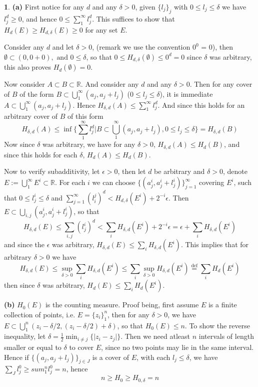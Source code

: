 \documentclass[10.5pt]{article}
\theoremstyle{definition}
\newtheorem{pb}{}
\newcommand{\set}[1]{\{#1\}}
\newcommand{\abs}[1]{\lvert#1\rvert}
\newcommand{\tand}{\text{ and }}
\begin{document}
    \begin{pb}
        \textbf{(a)} First notice for any \(d\) and any \(\delta > 0\), given \(\set{l_j}_j\) with \(0 \leq l_j \leq \delta\) we have \(l_j^d \geq 0\), and hence
        \(0 \leq \sum_1^\infty l_j^d\). This suffices to show that \(H_d(E) \geq H_{d,\delta}(E) \geq 0\) for any set \(E\).

        Consider any \(d\) and let \(\delta > 0\), (remark we use the convention \(0^0\) = 0), then \(\emptyset \subset (0,0+0), \tand 0 \leq \delta\), so that \(0 \leq H_{d,\delta}(\emptyset) \leq 0^d = 0\)
        since \(\delta\) was arbitrary, this also proves \(H_{d}(\emptyset) = 0\).

        Now consider \(A \subset B \subset \mathbb{R}\). And consider any \(d\) and any \(\delta > 0\). Then for any cover of \(B\) of the form \(B \subset \bigcup_1^\infty (a_j,a_j + l_j)\) (\(0 \leq l_j \leq \delta\)),
        it is immediate \(A \subset \bigcup_1^\infty (a_j,a_j + l_j)\). Hence \(H_{\delta,d}(A) \leq \sum_1^\infty l_j^d\). And since this holds for an arbitrary cover of \(B\) of this form
        \[H_{\delta,d}(A) \leq \inf\set{\sum_1^\infty l_j^d \vert B \subset \bigcup_1^\infty (a_j,a_j + l_j), 0 \leq l_j \leq \delta} = H_{\delta,d}(B)\]
        Now since \(\delta\) was arbitrary, we have for any \(\delta > 0\), \(H_{\delta,d}(A) \leq H_d(B)\), and since this holds for each \(\delta\), \(H_{d}(A) \leq H_d(B)\).

        Now to verify subadditivity, let \(\epsilon > 0\), then let \(d\) be arbitrary and \(\delta > 0\),
        denote \(E := \bigcup_1^\infty E^i \subset \mathbb{R}\). For each \(i\) we can choose \(\set{(a_j^i,a_j^i + l_j^i)}_{j=1}^\infty\) covering \(E^i\), such that \(0 \leq l_j^i \leq \delta\)
        and \(\sum_{j=1}^\infty (l_i^j)^d < H_{d,\delta}(E^i) + 2^{-i}\epsilon\). Then \(E \subset \bigcup_{i,j}(a_j^i, a_j^i + l_j^i)\), so that
        \[H_{\delta,d}(E) \leq \sum_{i,j}(l_j^i)^d < \sum_i H_{\delta,d}(E^i) + 2^{-i}\epsilon = \epsilon + \sum_i H_{\delta,d}(E^i)\]
        and since the \(\epsilon\) was arbitrary, \(H_{\delta,d}(E) \leq \sum_i H_{\delta,d}(E^i)\). This implies that for arbitrary \(\delta > 0\) we have
        \[H_{\delta,d}(E) \leq \sup_{\delta > 0}\sum_i H_{\delta,d}(E^i) \leq \sum_i \sup_{\delta > 0}H_{\delta,d}(E^i) \overset{\text{def}}{=} \sum_i H_d(E^i)\]
        then since \(\delta\) was arbitrary, \(H_{d}(E) \leq \sum_i H_d(E^i)\).

        \textbf{(b)} \(H_0(E)\) is the counting measure. Proof being, first assume \(E\) is a finite collection of points, i.e. \(E = \set{z_i}_1^n \), then for any \(\delta > 0\), 
        we have \(E \subset \bigcup_1^n (z_i - \delta/2, (z_i - \delta/2) + \delta)\), so that \(H_0(E) \leq n\). To show the reverse inequality, let \(\delta = \frac12 \min_{i \neq j}\set{\abs{z_i - z_j}}\).
        Then we need atleast \(n\) intervals of length smaller or equal to \(\delta\) to cover \(E\), since no two points may lie in the same interval. 
        Hence if \(\set{(a_j, a_j + l_j)}_{j \in J}\) is a cover of \(E\), with each \(l_j \leq \delta\), we have \(\sum_{J} l_j^0  \geq sum_1^n l_j^0 = n\), hence
        \[n \geq H_0 \geq H_{0,\delta} = n\]


\end{pb}
\end{document}
